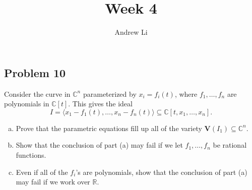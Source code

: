 \documentclass{homework}
\title{Week 4}
\author{Andrew Li}
\newcommand{\id}[1]{\langle #1 \rangle}
\newcommand{\V}{\mathbf{V}}
\begin{document}
    \maketitle
    
    \setcounter{section}{3}
    \setcounter{subsection}{2}
    \subsection{Problem 10}
    Consider the curve in $\mathbb C^n$ parameterized by $x_i = f_i(t)$, where $f_1, \dots, f_n$ are polynomials in $\mathbb C[t]$. This gives the ideal
    \[I = \id{x_1 - f_1(t), \dots, x_n - f_n(t)} \subseteq \mathbb C[t, x_1, \dots, x_n].\]
    \begin{enumerate}[(a)]
        \item Prove that the parametric equations fill up all of the variety $\V(I_1) \subseteq \mathbb C^n$.
        \item Show that the conclusion of part (a) may fail if we let $f_1, \dots, f_n$ be rational functions.
        \item Even if all of the $f_i$'s are polynomials, show that the conclusion of part (a) may fail if we work over $\mathbb R$.
    \end{enumerate}
    
\end{document}
